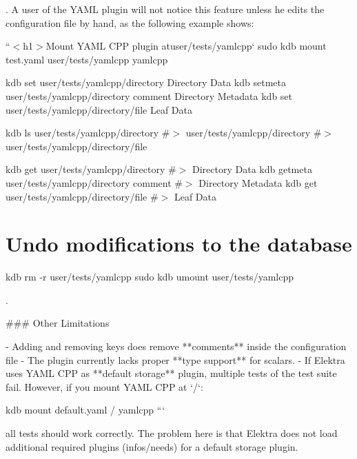 . A user of the Y\+A\+ML plugin will not notice this feature unless he edits the configuration file by hand, as the following example shows\+:

``{\ttfamily  $<$h1$>$Mount Y\+A\+ML C\+PP plugin at}user/tests/yamlcpp` sudo kdb mount test.\+yaml user/tests/yamlcpp yamlcpp

kdb set user/tests/yamlcpp/directory \textquotesingle{}Directory Data\textquotesingle{} kdb setmeta user/tests/yamlcpp/directory comment \textquotesingle{}Directory Metadata\textquotesingle{} kdb set user/tests/yamlcpp/directory/file \textquotesingle{}Leaf Data\textquotesingle{}

kdb ls user/tests/yamlcpp/directory \#$>$ user/tests/yamlcpp/directory \#$>$ user/tests/yamlcpp/directory/file

kdb get user/tests/yamlcpp/directory \#$>$ Directory Data kdb getmeta user/tests/yamlcpp/directory comment \#$>$ Directory Metadata kdb get user/tests/yamlcpp/directory/file \#$>$ Leaf Data

\section*{Undo modifications to the database}

kdb rm -\/r user/tests/yamlcpp sudo kdb umount user/tests/yamlcpp 
\begin{DoxyCode}
.

### Other Limitations

- Adding and removing keys does remove **comments** inside the configuration file
- The plugin currently lacks proper **type support** for scalars.
- If Elektra uses YAML CPP as **default storage** plugin, multiple tests of the test suite fail. However,
       if you mount YAML CPP at `/`:
\end{DoxyCode}
 kdb mount default.\+yaml / yamlcpp ```

all tests should work correctly. The problem here is that Elektra does not load additional required plugins ({\ttfamily infos/needs}) for a default storage plugin. 